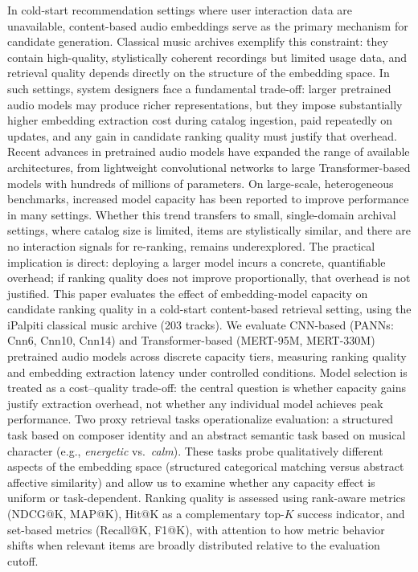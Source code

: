 \documentclass{CPP}
\begin{document}
In cold-start recommendation settings where user interaction data are unavailable, content-based audio embeddings serve as the primary mechanism for candidate generation. Classical music archives exemplify this constraint: they contain high-quality, stylistically coherent recordings but limited usage data, and retrieval quality depends directly on the structure of the embedding space. In such settings, system designers face a fundamental trade-off: larger pretrained audio models may produce richer representations, but they impose substantially higher embedding extraction cost during catalog ingestion, paid repeatedly on updates, and any gain in candidate ranking quality must justify that overhead. Recent advances in pretrained audio models have expanded the range of available architectures, from lightweight convolutional networks to large Transformer-based models with hundreds of millions of parameters. On large-scale, heterogeneous benchmarks, increased model capacity has been reported to improve performance in many settings. Whether this trend transfers to small, single-domain archival settings, where catalog size is limited, items are stylistically similar, and there are no interaction signals for re-ranking, remains underexplored. The practical implication is direct: deploying a larger model incurs a concrete, quantifiable overhead; if ranking quality does not improve proportionally, that overhead is not justified. This paper evaluates the effect of embedding-model capacity on candidate ranking quality in a cold-start content-based retrieval setting, using the iPalpiti classical music archive (203 tracks). We evaluate CNN-based (PANNs: Cnn6, Cnn10, Cnn14) and Transformer-based (MERT-95M, MERT-330M) pretrained audio models across discrete capacity tiers, measuring ranking quality and embedding extraction latency under controlled conditions. Model selection is treated as a cost--quality trade-off: the central question is whether capacity gains justify extraction overhead, not whether any individual model achieves peak performance. Two proxy retrieval tasks operationalize evaluation: a structured task based on composer identity and an abstract semantic task based on musical character (e.g., \emph{energetic} vs.\ \emph{calm}). These tasks probe qualitatively different aspects of the embedding space (structured categorical matching versus abstract affective similarity) and allow us to examine whether any capacity effect is uniform or task-dependent. Ranking quality is assessed using rank-aware metrics (NDCG@K, MAP@K), Hit@K as a complementary top-$K$ success indicator, and set-based metrics (Recall@K, F1@K), with attention to how metric behavior shifts when relevant items are broadly distributed relative to the evaluation cutoff.
\end{document}
